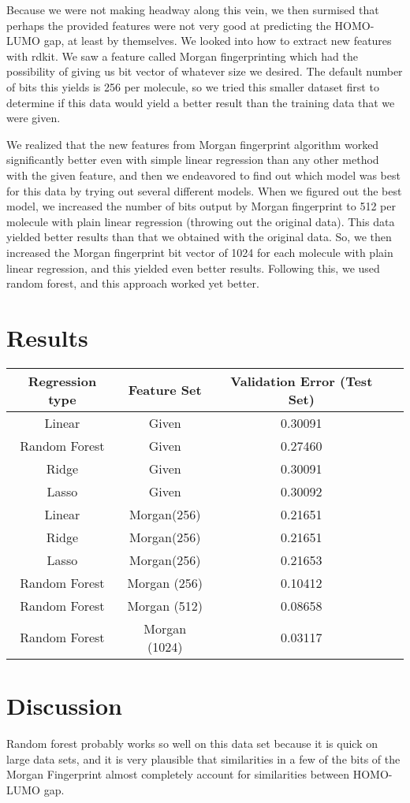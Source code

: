 \documentclass[11pt]{article}
\begin{document}
Because we were not making headway along this vein, we then surmised that perhaps the provided features were not very good at predicting the HOMO-LUMO gap, at least by themselves. We looked into how to extract new features with rdkit. We saw a feature called Morgan fingerprinting which had the possibility of giving us bit vector of whatever size we desired. The default number of bits this yields is 256 per molecule, so we tried this smaller dataset first to determine if this data would yield a better result than the training data that we were given. 

We realized that the new features from Morgan fingerprint algorithm worked significantly better even with simple linear regression than any other method with the given feature, and then we endeavored to find out which model was best for this data by trying out several different models. When we figured out the best model, we increased the number of bits output by Morgan fingerprint to 512 per molecule with plain linear regression (throwing out the original data). This data yielded better results than that we obtained with the original data. So, we then increased the Morgan fingerprint bit vector of 1024 for each molecule with plain linear regression, and this yielded even better results. Following this, we used random forest, and this approach worked yet better.

\section{Results}

\begin{center}
\begin{tabular}{|c|c|c|c|}
\hline
Regression type & Feature Set & Validation Error (Test Set)\\
\hline
Linear &Given & 0.30091\\
Random Forest & Given& 0.27460\\
Ridge & Given& 0.30091\\
Lasso &Given& 0.30092\\
Linear&Morgan(256)& 0.21651\\
Ridge&Morgan(256)& 0.21651\\
Lasso&Morgan(256)& 0.21653 \\
Random Forest&Morgan (256)& 0.10412\\
Random Forest&Morgan (512)& 0.08658\\
Random Forest&Morgan (1024)& 0.03117\\
\hline
\end{tabular}
\end{center}

\section{Discussion}
Random forest probably works so well on this data set because it is quick on large data sets, and it is very plausible that similarities in a few of the bits of the Morgan Fingerprint almost completely account for similarities between HOMO-LUMO gap.
\end{document}
